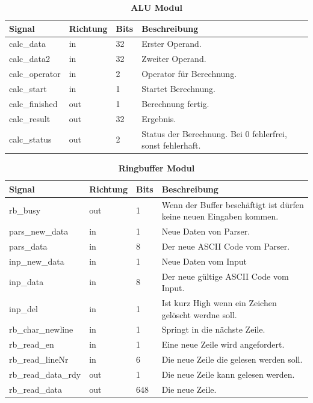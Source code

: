 \begin{table}[!h]
\caption{\textbf{ALU Modul}}
 \begin{center}
  \begin{tabular}{|p{4cm}|p{}|p{1cm}|p{9cm}|}
   \hline Signal & Richtung & Bits & Beschreibung\\
   \hline
   calc\_data & in & 32 & Erster Operand.\\
   calc\_data2 & in & 32 & Zweiter Operand.\\
   calc\_operator & in & 2 & Operator für Berechnung.\\
   calc\_start & in & 1 & Startet Berechnung.\\
   calc\_finished & out & 1 & Berechnung fertig.\\
   calc\_result & out & 32 & Ergebnis.\\
   calc\_status & out & 2 & Status der Berechnung. Bei 0 fehlerfrei, sonst fehlerhaft.\\
   \hline
  \end{tabular}
 \end{center}
\end{table}


\begin{table}[!h]
 \caption{\textbf{Ringbuffer Modul}}
 \begin{center}
  \begin{tabular}{|p{4cm}|p{}|p{1cm}|p{9cm}|}
   \hline Signal & Richtung & Bits & Beschreibung\\
   \hline
   rb\_busy & out & 1 & Wenn der Buffer beschäftigt ist dürfen keine neuen Eingaben kommen.\\
   pars\_new\_data & in & 1 & Neue Daten von Parser.\\
   pars\_data & in & 8 & Der neue ASCII Code vom Parser.\\
   inp\_new\_data & in & 1 & Neue Daten vom Input\\
   inp\_data & in & 8 & Der neue gültige ASCII Code vom Input.\\
   inp\_del & in & 1 & Ist kurz High wenn ein Zeichen gelöscht werdne soll.\\
   rb\_char\_newline & in & 1 & Springt in die nächste Zeile.\\
   rb\_read\_en & in & 1 & Eine neue Zeile wird angefordert.\\
   rb\_read\_lineNr & in & 6 & Die neue Zeile die gelesen werden soll.\\
   rb\_read\_data\_rdy & out & 1 & Die neue Zeile kann gelesen werden.\\
   rb\_read\_data &out & 648 & Die neue Zeile.\\
   \hline
  \end{tabular}
 \end{center}
\end{table}

